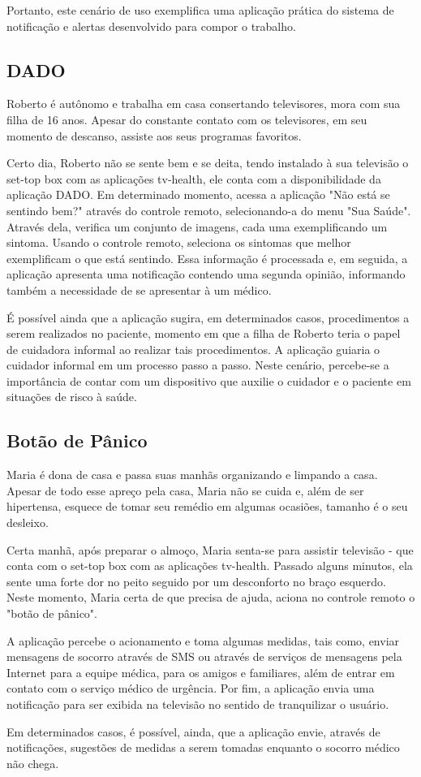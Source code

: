 Portanto, este cenário de uso exemplifica uma aplicação prática do sistema de
notificação e alertas desenvolvido para compor o trabalho.

\subsection{DADO}\label{subsec:dado}

Roberto é autônomo e trabalha em casa consertando televisores, mora com sua
filha de 16 anos. Apesar do constante contato com os televisores, em seu momento
de descanso, assiste aos seus programas favoritos.

Certo dia, Roberto não se sente bem e se deita, tendo instalado à sua televisão
o set-top box com as aplicações tv-health, ele conta com a disponibilidade da
aplicação DADO. Em determinado momento, acessa a aplicação "Não está se sentindo
bem?" através do controle remoto, selecionando-a do menu "Sua Saúde". Através
dela, verifica um conjunto de imagens, cada uma exemplificando um sintoma.
Usando o controle remoto, seleciona os sintomas que melhor exemplificam o que
está sentindo. Essa informação é processada e, em seguida, a aplicação apresenta
uma notificação contendo uma segunda opinião, informando também a necessidade de
se apresentar à um médico.

É possível ainda que a aplicação sugira, em determinados casos, procedimentos a
serem realizados no paciente, momento em que a filha de Roberto teria o papel de
cuidadora informal ao realizar tais procedimentos. A aplicação guiaria o
cuidador informal em um processo passo a passo. Neste cenário,  percebe-se a
importância de contar com um dispositivo que auxilie o cuidador e o paciente em
situações de risco à saúde.

\subsection{Botão de Pânico}\label{subsec:botao-panico}

Maria é dona de casa e passa suas manhãs organizando e limpando a casa. Apesar
de todo esse apreço pela casa, Maria não se cuida e, além de ser hipertensa,
esquece de tomar seu remédio em algumas ocasiões, tamanho é o seu desleixo.

Certa manhã, após preparar o almoço, Maria senta-se para assistir televisão -
que conta com o set-top box com as aplicações tv-health. Passado
alguns minutos, ela sente uma forte dor no peito seguido por um desconforto no
braço esquerdo. Neste momento, Maria certa de que precisa de ajuda, aciona no
controle remoto o "botão de pânico".

A aplicação percebe o acionamento e toma algumas medidas, tais como, enviar
mensagens de socorro através de SMS ou através de serviços de mensagens pela
Internet para a equipe médica, para os amigos e familiares, além de entrar em
contato com o serviço médico de urgência. Por fim, a aplicação envia uma
notificação para ser exibida na televisão no sentido de tranquilizar o usuário.

Em determinados casos, é possível, ainda, que a aplicação envie, através de
notificações, sugestões de medidas a serem tomadas enquanto o socorro médico não
chega.
